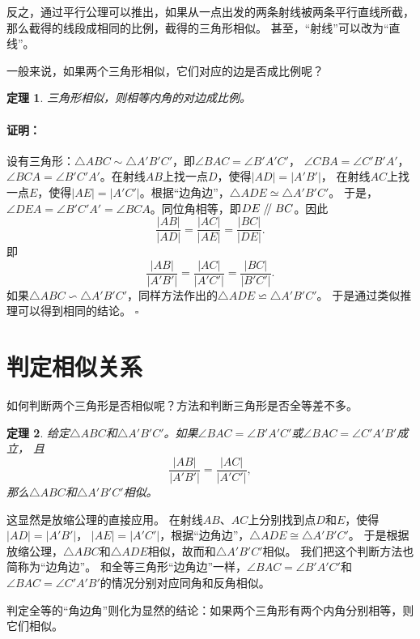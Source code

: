 \documentclass[12pt,UTF8]{ctexbook}
\newtheorem{tm}{定理}[section]
\newenvironment{proof2}{\paragraph{\textbf{证明：}}}{\hfill$\square$}
\renewcommand\parallel{\mathrel{/\mskip-4mu/}}
\begin{document}
反之，通过平行公理可以推出，如果从一点出发的两条射线被两条平行直线所截，那么截得的线段成相同的比例，截得的三角形相似。
甚至，“射线”可以改为“直线”。

一般来说，如果两个三角形相似，它们对应的边是否成比例呢？
\begin{tm}\label{tm:0-0-1}
    三角形相似，则相等内角的对边成比例。
\end{tm}
\begin{proof2}
    设有三角形：$\triangle ABC \sim \triangle A'B'C'$，即$\angle BAC = \angle B'A'C'$，
    $\angle CBA = \angle C'B'A'$，$\angle BCA = \angle B'C'A'$。在射线$AB$上找一点$D$，使得$|AD| = |A'B'|$，
    在射线$AC$上找一点$E$，使得$|AE| = |A'C'|$。根据“边角边”，$\triangle ADE \simeq \triangle A'B'C'$。
    于是，$\angle DEA = \angle B'C'A' = \angle BCA$。同位角相等，即$DE \parallel BC$。因此
    $$ \frac{|AB|}{|AD|} = \frac{|AC|}{|AE|} = \frac{|BC|}{|DE|}.$$
    即
    $$ \frac{|AB|}{|A'B'|} = \frac{|AC|}{|A'C'|} = \frac{|BC|}{|B'C'|}.$$
    如果$\triangle ABC \backsim \triangle A'B'C'$，同样方法作出的$\triangle ADE \backsimeq \triangle A'B'C'$。
    于是通过类似推理可以得到相同的结论。
\end{proof2}

\section{判定相似关系}
如何判断两个三角形是否相似呢？方法和判断三角形是否全等差不多。

\begin{tm}\label{tm:0-1-0}
    给定$\triangle ABC$和$\triangle A'B'C'$。如果$\angle BAC = \angle B'A'C'$或$\angle BAC = \angle C'A'B'$成立，
    且
    $$ \frac{|AB|}{|A'B'|} = \frac{|AC|}{|A'C'|},$$
    那么$\triangle ABC$和$\triangle A'B'C'$相似。
\end{tm}
这显然是放缩公理的直接应用。
在射线$AB$、$AC$上分别找到点$D$和$E$，使得$|AD| = |A'B'|$，
$|AE| = |A'C'|$，根据“边角边”，$\triangle ADE \cong \triangle A'B'C'$。
于是根据放缩公理，$\triangle ABC$和$\triangle ADE$相似，故而和$\triangle A'B'C'$相似。
我们把这个判断方法也简称为“边角边”。
和全等三角形“边角边”一样，$\angle BAC = \angle B'A'C'$和$\angle BAC = \angle C'A'B'$的情况分别对应同角和反角相似。

判定全等的“角边角”则化为显然的结论：如果两个三角形有两个内角分别相等，则它们相似。
\end{document}
